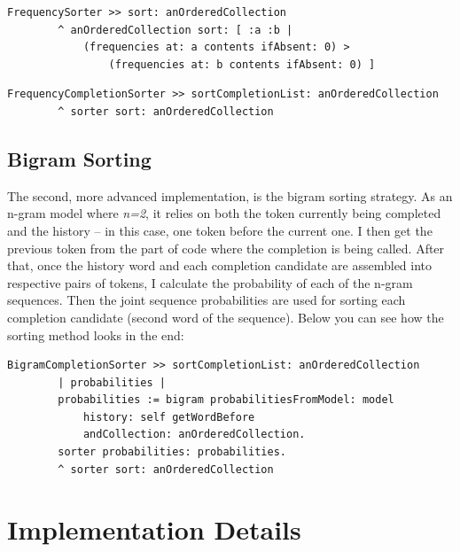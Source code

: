 \begin{lstlisting}[caption={The sorter implementation: sorting the candidates according to their frequencies}, label={lst:unigramCode2}]
    FrequencySorter >> sort: anOrderedCollection
        ^ anOrderedCollection sort: [ :a :b |
            (frequencies at: a contents ifAbsent: 0) >
                (frequencies at: b contents ifAbsent: 0) ]
\end{lstlisting}

\begin{lstlisting}[caption={The unigram sorter implementation: returning the results sorted in the code above}, label={lst:unigramCode3}]
    FrequencyCompletionSorter >> sortCompletionList: anOrderedCollection
        ^ sorter sort: anOrderedCollection
\end{lstlisting}

\subsection{Bigram Sorting}
The second, more advanced implementation, is the bigram sorting strategy. As an n-gram model where \textit{n=2}, it relies on both the token currently being completed and the history -- in this case, one token before the current one. I then get the previous token from the part of code where the completion is being called. After that, once the history word and each completion candidate are assembled into respective pairs of tokens, I calculate the probability of each of the n-gram sequences. Then the joint sequence probabilities are used for sorting each completion candidate (second word of the sequence). Below you can see how the sorting method looks in the end:

\begin{lstlisting}[caption={The bigram sorter implementation: receives the list of completions, gets the word before from context, trains the model, and sorts the completions based on sequence probabilities}, label={lst:bigramCode}]
    BigramCompletionSorter >> sortCompletionList: anOrderedCollection
        | probabilities |
        probabilities := bigram probabilitiesFromModel: model
            history: self getWordBefore
            andCollection: anOrderedCollection.
        sorter probabilities: probabilities.
        ^ sorter sort: anOrderedCollection
\end{lstlisting}

\section{Implementation Details}
\label{sec:ProposedSolution-Implementation}
